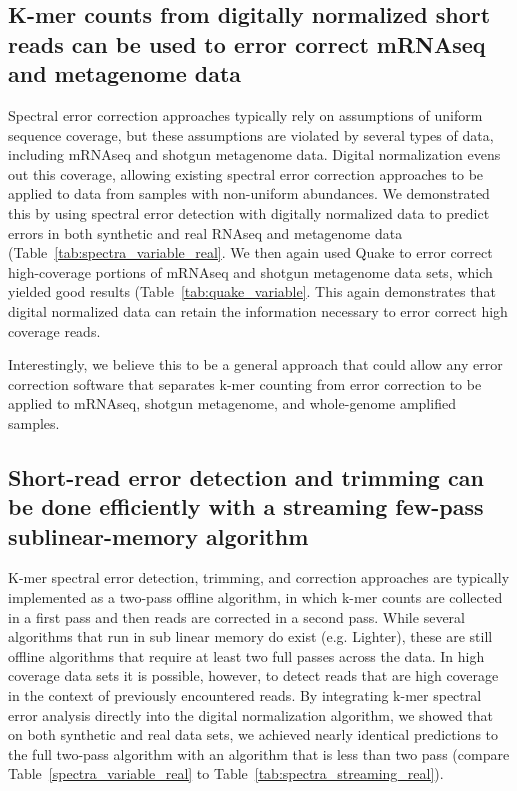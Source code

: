 \documentclass{article}
\begin{document}
\subsection{K-mer counts from digitally normalized short reads can be used to error correct mRNAseq and metagenome data}

Spectral error correction approaches typically rely on assumptions of
uniform sequence coverage, but these assumptions are violated by
several types of data, including mRNAseq and shotgun metagenome data.
Digital normalization evens out this coverage, allowing existing
spectral error correction approaches to be applied to data from
samples with non-uniform abundances.  We demonstrated this by using
spectral error detection with digitally normalized data to predict
errors in both synthetic and real RNAseq and metagenome data
(Table~\ref{tab:spectra_variable_real}.  We then again used Quake to
error correct high-coverage portions of mRNAseq and shotgun metagenome
data sets, which yielded good results (Table~\ref{tab:quake_variable}.
This again demonstrates that digital normalized data can retain the
information necessary to error correct high coverage reads.

Interestingly, we believe this to be a general approach that could
allow any error correction software that separates k-mer counting from
error correction to be applied to mRNAseq, shotgun metagenome, and
whole-genome amplified samples.


\subsection{Short-read error detection and trimming can be done efficiently with a streaming few-pass sublinear-memory algorithm}

K-mer spectral error detection, trimming, and correction approaches
are typically implemented as a two-pass offline algorithm, in which
k-mer counts are collected in a first pass and then reads are
corrected in a second pass.  While several algorithms that run in sub
linear memory do exist (e.g. Lighter), these are still offline
algorithms that require at least two full passes across the data.  In
high coverage data sets it is possible, however, to detect reads that
are high coverage in the context of previously encountered reads.  By
integrating k-mer spectral error analysis directly into the digital
normalization algorithm, we showed that on both synthetic and real
data sets, we achieved nearly identical predictions to the full
two-pass algorithm with an algorithm that is less than two pass
(compare Table~\ref{spectra_variable_real} to
Table~\ref{tab:spectra_streaming_real}).
\end{document}
